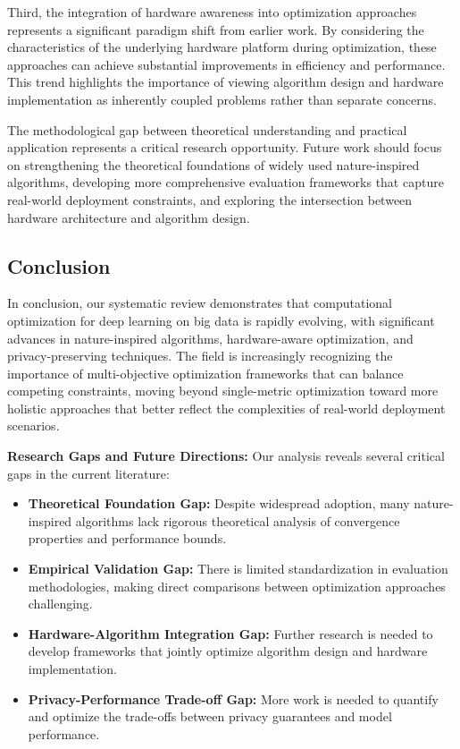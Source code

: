 Third, the integration of hardware awareness into optimization approaches represents a significant paradigm shift from earlier work. By considering the characteristics of the underlying hardware platform during optimization, these approaches can achieve substantial improvements in efficiency and performance. This trend highlights the importance of viewing algorithm design and hardware implementation as inherently coupled problems rather than separate concerns.

The methodological gap between theoretical understanding and practical application represents a critical research opportunity. Future work should focus on strengthening the theoretical foundations of widely used nature-inspired algorithms, developing more comprehensive evaluation frameworks that capture real-world deployment constraints, and exploring the intersection between hardware architecture and algorithm design.

\subsection{Conclusion}
In conclusion, our systematic review demonstrates that computational optimization for deep learning on big data is rapidly evolving, with significant advances in nature-inspired algorithms, hardware-aware optimization, and privacy-preserving techniques. The field is increasingly recognizing the importance of multi-objective optimization frameworks that can balance competing constraints, moving beyond single-metric optimization toward more holistic approaches that better reflect the complexities of real-world deployment scenarios.

\textbf{Research Gaps and Future Directions:} Our analysis reveals several critical gaps in the current literature:
\begin{itemize}
    \item \textbf{Theoretical Foundation Gap:} Despite widespread adoption, many nature-inspired algorithms lack rigorous theoretical analysis of convergence properties and performance bounds.
    \item \textbf{Empirical Validation Gap:} There is limited standardization in evaluation methodologies, making direct comparisons between optimization approaches challenging.
    \item \textbf{Hardware-Algorithm Integration Gap:} Further research is needed to develop frameworks that jointly optimize algorithm design and hardware implementation.
    \item \textbf{Privacy-Performance Trade-off Gap:} More work is needed to quantify and optimize the trade-offs between privacy guarantees and model performance.
\end{itemize}

